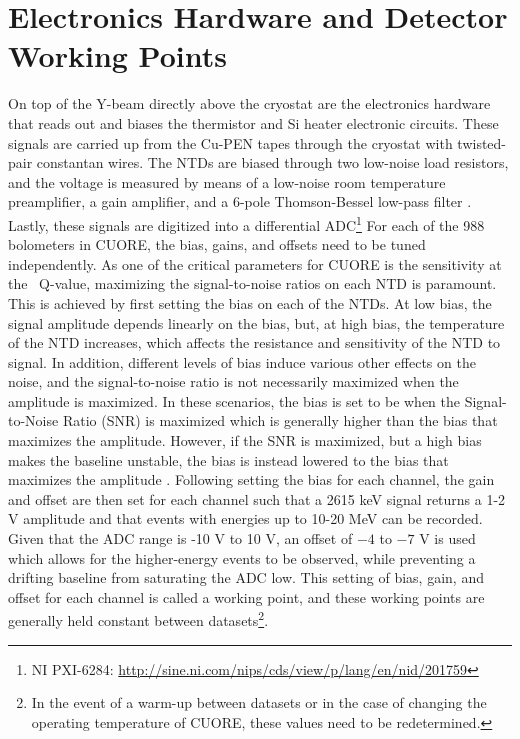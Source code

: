 \section{Electronics Hardware and Detector Working Points}
\label{sec:Electronics Hardware}
On top of the Y-beam directly above the cryostat are the electronics hardware that reads out and biases the thermistor and Si heater electronic circuits.
These signals are carried up from the Cu-PEN tapes through the cryostat with twisted-pair constantan wires.
The NTDs are biased through two low-noise load resistors, and the voltage is measured by means of a low-noise room temperature preamplifier, a gain amplifier, and a 6-pole Thomson-Bessel low-pass filter \cite{doi:10.1063/1.4936269, PESSINA2000132, ARNABOLDI2010327}.
Lastly, these signals are digitized into a differential ADC\footnote{\RaggedRight NI PXI-6284: \url{http://sine.ni.com/nips/cds/view/p/lang/en/nid/201759}}
For each of the 988 bolometers in CUORE, the bias, gains, and offsets need to be tuned independently.
As one of the critical parameters for CUORE is the sensitivity at the \zeronubb~Q-value, maximizing the signal-to-noise ratios on each NTD is paramount.
This is achieved by first setting the bias on each of the NTDs.
At low bias, the signal amplitude depends linearly on the bias, but, at high bias, the temperature of the NTD increases, which affects the resistance and sensitivity of the NTD to signal.
In addition, different levels of bias induce various other effects on the noise, and the signal-to-noise ratio is not necessarily maximized when the amplitude is maximized.
In these scenarios, the bias is set to be when the Signal-to-Noise Ratio (SNR) is maximized which is generally higher than the bias that maximizes the amplitude.
However, if the SNR is maximized, but a high bias makes the baseline unstable, the bias is instead lowered to the bias that maximizes the amplitude \cite{Lucia:LoadCurvesDoc}.
Following setting the bias for each channel, the gain and offset are then set for each channel such that a 2615 keV signal returns a 1-2 V amplitude and that events with energies up to 10-20 MeV can be recorded.
Given that the ADC range is -10 V to 10 V, an offset of $-4$ to $-7$ V is used which allows for the higher-energy events to be observed, while preventing a drifting baseline from saturating the ADC low.
This setting of bias, gain, and offset for each channel is called a working point, and these working points are generally held constant between datasets\footnote{In the event of a warm-up between datasets or in the case of changing the operating temperature of CUORE, these values need to be redetermined.}.

